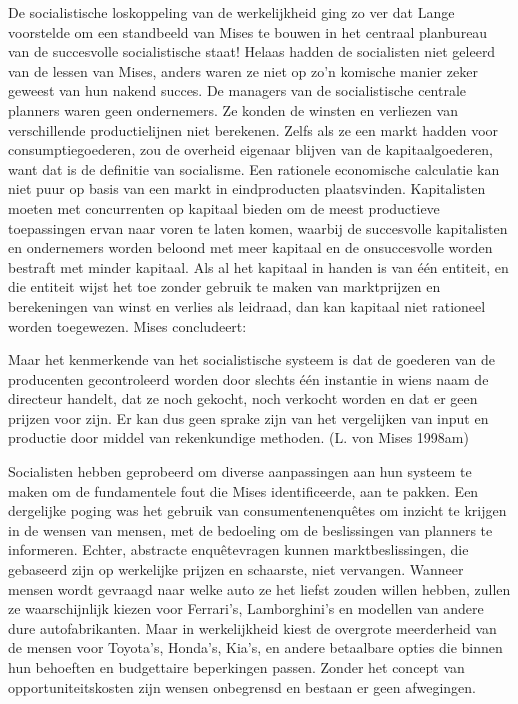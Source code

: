 \documentclass[
  a5paper,
  smalldemyvopaper,11pt,twoside,onecolumn,openright,extrafontsizes,
hidelinks]{memoir}
\begin{document}
De socialistische loskoppeling van de werkelijkheid ging zo ver dat
Lange voorstelde om een standbeeld van Mises te bouwen in het centraal
planbureau van de succesvolle socialistische staat! Helaas hadden de
socialisten niet geleerd van de lessen van Mises, anders waren ze niet
op zo'n komische manier zeker geweest van hun nakend succes. De managers
van de socialistische centrale planners waren geen ondernemers. Ze
konden de winsten en verliezen van verschillende productielijnen niet
berekenen. Zelfs als ze een markt hadden voor consumptiegoederen, zou de
overheid eigenaar blijven van de kapitaalgoederen, want dat is de
definitie van socialisme. Een rationele economische calculatie kan niet
puur op basis van een markt in eindproducten plaatsvinden. Kapitalisten
moeten met concurrenten op kapitaal bieden om de meest productieve
toepassingen ervan naar voren te laten komen, waarbij de succesvolle
kapitalisten en ondernemers worden beloond met meer kapitaal en de
onsuccesvolle worden bestraft met minder kapitaal. Als al het kapitaal
in handen is van één entiteit, en die entiteit wijst het toe zonder
gebruik te maken van marktprijzen en berekeningen van winst en verlies
als leidraad, dan kan kapitaal niet rationeel worden toegewezen. Mises
concludeert:

Maar het kenmerkende van het socialistische systeem is dat de goederen
van de producenten gecontroleerd worden door slechts één instantie in
wiens naam de directeur handelt, dat ze noch gekocht, noch verkocht
worden en dat er geen prijzen voor zijn. Er kan dus geen sprake zijn van
het vergelijken van input en productie door middel van rekenkundige
methoden. (L. von Mises 1998am)

Socialisten hebben geprobeerd om diverse aanpassingen aan hun systeem te
maken om de fundamentele fout die Mises identificeerde, aan te pakken.
Een dergelijke poging was het gebruik van consumentenenquêtes om inzicht
te krijgen in de wensen van mensen, met de bedoeling om de beslissingen
van planners te informeren. Echter, abstracte enquêtevragen kunnen
marktbeslissingen, die gebaseerd zijn op werkelijke prijzen en
schaarste, niet vervangen. Wanneer mensen wordt gevraagd naar welke auto
ze het liefst zouden willen hebben, zullen ze waarschijnlijk kiezen voor
Ferrari's, Lamborghini's en modellen van andere dure autofabrikanten.
Maar in werkelijkheid kiest de overgrote meerderheid van de mensen voor
Toyota's, Honda's, Kia's, en andere betaalbare opties die binnen hun
behoeften en budgettaire beperkingen passen. Zonder het concept van
opportuniteitskosten zijn wensen onbegrensd en bestaan er geen
afwegingen.
\end{document}
